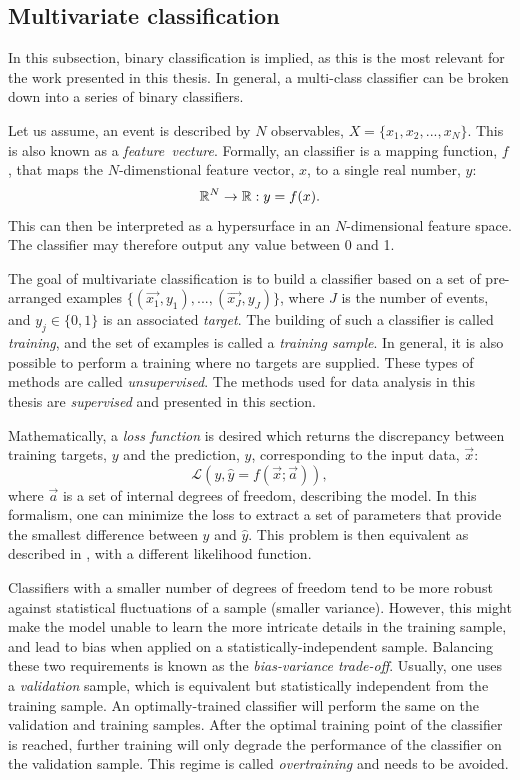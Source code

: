 \subsection{Multivariate classification}

In this subsection, binary classification is implied, as this is the most relevant for the work presented in this thesis. 
In general, a multi-class \MVA classifier can be broken down into a series of binary \MVA classifiers.

Let us assume, an event is described by $N$ observables, $X=\{x_1,x_2,...,x_N\}$. This is also known as a \textit{feature~vecture}.
Formally, an \MVA classifier is a mapping function, $f$, that maps the $N$-dimenstional feature vector, $x$, to a single real number, $y$:
\begin{equation}
    \mathbb{R}^N \rightarrow \mathbb{R}: y = f(x).
\end{equation}
This can then be interpreted as a hypersurface in an $N$-dimensional feature space.
The classifier may therefore output any value between 0 and 1.

The goal of multivariate classification is to build a classifier based on a set of pre-arranged examples $\{(\vec{x_1},y_1),..., (\vec{x_J},y_J)\}$, where $J$ is the number of events, and $y_j\in\{0,1\}$ is an associated \textit{target}.
The building of such a classifier is called \textit{training}, and the set of examples is called a \textit{training sample}.
In general, it is also possible to perform a training where no targets are supplied. 
These types of methods are called \textit{unsupervised}.
The methods used for data analysis in this thesis are \textit{supervised} and presented in this section.

Mathematically, a \textit{loss function} is desired which returns the discrepancy between training targets, $y$ and the prediction, $\hat{y}$, corresponding to the input data, $\vec{x}$:
\begin{equation}\label{eq:loss_function}
    \mathcal{L}(y, \hat{y} = f(\vec{x};\vec{a})),
\end{equation}
where $\vec{a}$ is a set of internal degrees of freedom, describing the model. 
In this formalism, one can minimize the loss to extract a set of parameters that provide the smallest difference between $y$ and $\hat{y}$.
This problem is then equivalent as described in , with a different likelihood function.

Classifiers with a smaller number of degrees of freedom tend to be more robust against statistical fluctuations of a sample (smaller variance).
However, this might make the model unable to learn the more intricate details in the training sample, and lead to bias when applied on a statistically-independent sample.
Balancing these two requirements is known as the \textit{bias-variance trade-off}. 
Usually, one uses a \textit{validation} sample, which is equivalent but statistically independent from the training sample.
An optimally-trained classifier will perform the same on the validation and training samples. 
After the optimal training point of the classifier is reached, further training will only degrade the performance of the classifier on the validation sample.
This regime is called \textit{overtraining} and needs to be avoided.

